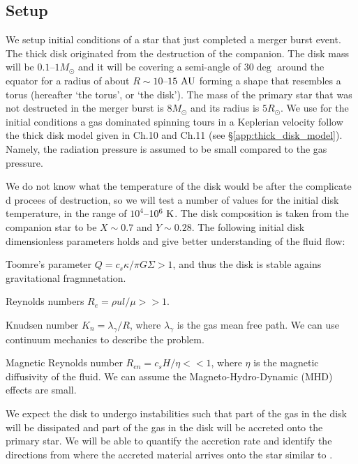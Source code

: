 \documentclass[a4paper,modern]{aastex62}
\def \K{~\rm{K}}
\def \AU{~\rm{AU}}
\begin{document}
\subsection{Setup}
\label{sec:setup}
We setup initial conditions of a star that just completed a merger burst event.
The thick disk originated from the destruction of the companion.
The disk mass will be $0.1$--$1 M_\odot$ and it will be covering a semi-angle of $30 \deg$ around the equator for a radius of about $R\sim10$--$15 \AU$ forming a shape that resembles a torus (hereafter `the torus', or `the disk').
The mass of the primary star that was not destructed in the merger burst is $8 M_\odot$ and its radius is $5 R_\odot$.
We use for the initial conditions a gas dominated spinning tours in a Keplerian velocity follow the thick disk model given in \cite{2002apa..book.....F} Ch.10 and Ch.11 (see \S\ref{app:thick_disk_model}). Namely, the radiation pressure is assumed to be small compared to the gas pressure.

We do not know what the temperature of the disk would be after the complicate d procees of destruction, so we will test a number of values for the initial disk temperature, in the range of $10^4$--$10^6 \K$.
The disk composition is taken from the companion star to be $X\sim0.7$ and $Y\sim0.28$.
The following initial disk dimensionless parameters holds and give better understanding of the fluid flow: 
\begin{enumerate*}[label={(\alph*)}]
\item Toomre’s parameter \citep{1964ApJ...139.1217T} $Q=c_s\kappa/\pi G \Sigma > 1$, and thus the disk is stable agains gravitational fragmnetation.
\item Reynolds numbers $R_e=\rho u l / \mu>>1$.
\item Knudsen number $K_n=\lambda_\gamma / R$, where $\lambda_\gamma$ is the gas mean free path.  We can use continuum mechanics to describe the problem.
\item Magnetic Reynolds number $R_{en}= c_s H/ \eta <<1$, where $\eta$ is the magnetic diffusivity of the fluid.  We can assume the Magneto-Hydro-Dynamic (MHD) effects are small.
\end{enumerate*}

We expect the disk to undergo instabilities \citep{1988MNRAS.232....1F,2018ASSL..454.....S}
such that part of the gas in the disk will be dissipated and part of the gas in the disk will be accreted onto the primary star.
We will be able to quantify the accretion rate and identify the directions from where the accreted material arrives onto the star similar to \cite{2018arXiv180502529K,2018Galax...6...82K}.
\end{document}
